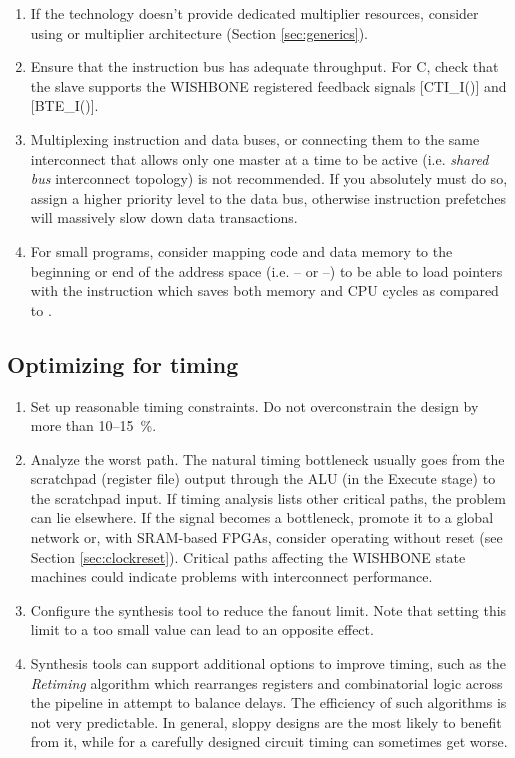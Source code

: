 \documentclass[a4paper,12pt,twoside,extrafontsizes]{memoir}
\begin{document}
\begin{enumerate}
	\item If the technology doesn't provide dedicated multiplier resources, consider using  or  multiplier architecture (Section \ref{sec:generics}).
	
	\item Ensure that the instruction bus has adequate throughput. For \lxp{}C, check that the slave supports the WISHBONE registered feedback signals [CTI\_I()] and [BTE\_I()].
	
	\item Multiplexing instruction and data buses, or connecting them to the same interconnect that allows only one master at a time to be active (i.e. \emph{shared bus} interconnect topology) is not recommended. If you absolutely must do so, assign a higher priority level to the data bus, otherwise instruction prefetches will massively slow down data transactions.
	
	\item For small programs, consider mapping code and data memory to the beginning or end of the address space (i.e. -- or --) to be able to load pointers with the  instruction which saves both memory and CPU cycles as compared to .
\end{enumerate}

\subsection{Optimizing for timing}

\begin{enumerate}
	\item Set up reasonable timing constraints. Do not overconstrain the design by more than 10--15~\%.
	
	\item Analyze the worst path. The natural \lxp{} timing bottleneck usually goes from the scratchpad (register file) output through the ALU (in the Execute stage) to the scratchpad input. If timing analysis lists other critical paths, the problem can lie elsewhere. If the  signal becomes a bottleneck, promote it to a global network or, with SRAM-based FPGAs, consider operating without reset (see Section \ref{sec:clockreset}). Critical paths affecting the WISHBONE state machines could indicate problems with interconnect performance.
	
	\item Configure the synthesis tool to reduce the fanout limit. Note that setting this limit to a too small value can lead to an opposite effect.
	
	\item Synthesis tools can support additional options to improve timing, such as the \emph{Retiming} algorithm which rearranges registers and combinatorial logic across the pipeline in attempt to balance delays. The efficiency of such algorithms is not very predictable. In general, sloppy designs are the most likely to benefit from it, while for a carefully designed circuit timing can sometimes get worse.
\end{enumerate}
\end{document}
